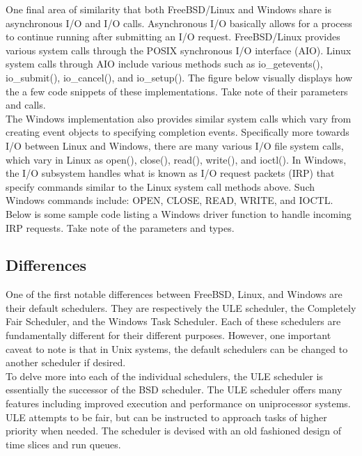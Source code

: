 \documentclass[letterpaper,10pt,titlepage]{article}
\begin{document}
One final area of similarity that both FreeBSD/Linux and Windows share is asynchronous I/O and I/O calls.  Asynchronous I/O basically allows for a process to continue running after submitting an I/O request.  FreeBSD/Linux provides various system calls through the POSIX synchronous I/O interface (AIO).  Linux system calls through AIO include various methods such as io\_getevents(),  io\_submit(), io\_cancel(), and io\_setup().  The figure below visually displays how the a few code snippets of these implementations. \cite{linuxAIO}  Take note of their parameters and calls.\\



The Windows implementation also provides similar system calls which vary from creating event objects to specifying completion events.  Specifically more towards I/O between Linux and Windows, there are many various I/O file system calls, which vary in Linux as open(), close(), read(), write(), and ioctl().\cite{lkd14}  In Windows, the I/O subsystem handles what is known as I/O request packets (IRP) that specify commands similar to the Linux system call methods above.  Such Windows commands include: OPEN, CLOSE, READ, WRITE, and IOCTL.\cite{mwi8}  Below is some sample code listing a Windows driver function to handle incoming IRP requests. \cite{windowsIRP} Take note of the parameters and types.\\



\subsection{Differences}

One of the first notable differences between FreeBSD, Linux, and Windows are their default schedulers.  They are respectively the ULE scheduler, the Completely Fair Scheduler, and the Windows Task Scheduler.  Each of these schedulers are fundamentally different for their different purposes.  However, one important caveat to note is that in Unix systems, the default schedulers can be changed to another scheduler if desired.\\

To delve more into each of the individual schedulers, the ULE scheduler is essentially the successor of the BSD scheduler.  The ULE scheduler offers many features including improved execution and performance on uniprocessor systems.\cite{lkd14}  ULE attempts to be fair, but can be instructed to approach tasks of higher priority when needed.  The scheduler is devised with an old fashioned design of time slices and run queues.\\
\end{document}
